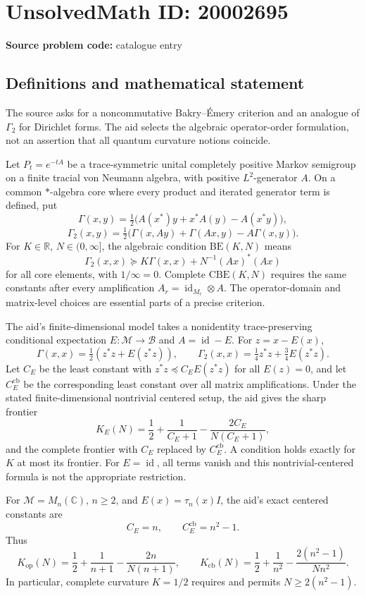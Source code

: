 \documentclass[11pt]{article}
\newcommand{\R}{\mathbb{R}}
\newcommand{\C}{\mathbb{C}}
\begin{document}
\section*{UnsolvedMath ID: 20002695}
\textbf{Source problem code:} catalogue entry
\subsection{Definitions and mathematical statement}
The source asks for a noncommutative Bakry--\'Emery criterion and an analogue of \(\Gamma_2\) for Dirichlet forms. The aid selects the algebraic operator-order formulation, not an assertion that all quantum curvature notions coincide.

Let \(P_t=e^{-tA}\) be a trace-symmetric unital completely positive Markov semigroup on a finite tracial von Neumann algebra, with positive \(L^2\)-generator \(A\). On a common \(*\)-algebra core where every product and iterated generator term is defined, put
\[
 \Gamma(x,y)=\tfrac12\bigl(A(x^*)y+x^*A(y)-A(x^*y)\bigr),
\]
\[
 \Gamma_2(x,y)=\tfrac12\bigl(\Gamma(x,Ay)+\Gamma(Ax,y)-A\Gamma(x,y)\bigr).
\]
For \(K\in\R\), \(N\in(0,\infty]\), the algebraic condition \(\mathrm{BE}(K,N)\) means
\[
 \Gamma_2(x,x)\succeq K\Gamma(x,x)+N^{-1}(Ax)^*(Ax)
\]
for all core elements, with \(1/\infty=0\). Complete \(\mathrm{CBE}(K,N)\) requires the same constants after every amplification \(A_r=\operatorname{id}_{M_r}\otimes A\). The operator-domain and matrix-level choices are essential parts of a precise criterion.

The aid's finite-dimensional model takes a nonidentity trace-preserving conditional expectation \(E:\mathcal M\to\mathcal B\) and \(A=\operatorname{id}-E\). For \(z=x-E(x)\),
\[
 \Gamma(x,x)=\tfrac12(z^*z+E(z^*z)),\qquad
 \Gamma_2(x,x)=\tfrac14z^*z+\tfrac34E(z^*z).
\]
Let \(C_E\) be the least constant with \(z^*z\preceq C_E E(z^*z)\) for all \(E(z)=0\), and let \(C_E^{\mathrm{cb}}\) be the corresponding least constant over all matrix amplifications. Under the stated finite-dimensional nontrivial centered setup, the aid gives the sharp frontier
\[
 K_E(N)=\frac12+\frac1{C_E+1}-\frac{2C_E}{N(C_E+1)},
\]
and the complete frontier with \(C_E\) replaced by \(C_E^{\mathrm{cb}}\). A condition holds exactly for \(K\) at most its frontier. For \(E=\operatorname{id}\), all terms vanish and this nontrivial-centered formula is not the appropriate restriction.

For \(\mathcal M=M_n(\C)\), \(n\ge2\), and \(E(x)=\tau_n(x)I\), the aid's exact centered constants are
\[
 C_E=n,\qquad C_E^{\mathrm{cb}}=n^2-1.
\]
Thus
\[
 K_{\mathrm{op}}(N)=\frac12+\frac1{n+1}-\frac{2n}{N(n+1)},\qquad
 K_{\mathrm{cb}}(N)=\frac12+\frac1{n^2}-\frac{2(n^2-1)}{Nn^2}.
\]
In particular, complete curvature \(K=1/2\) requires and permits \(N\ge2(n^2-1)\).
\end{document}
